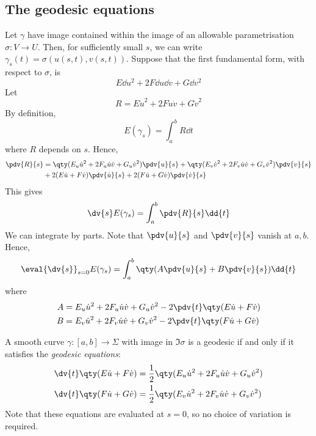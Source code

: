\subsection{The geodesic equations}
Let \( \gamma \) have image contained within the image of an allowable parametrisation \( \sigma \colon V \to U \).
Then, for sufficiently small \( s \), we can write \( \gamma_s(t) = \sigma(u(s,t), v(s,t)) \).
Suppose that the first fundamental form, with respect to \( \sigma \), is
\[
	E \dd{u}^2 + 2F \dd{u} \dd{v} + G \dd{v}^2
\]
Let
\[
	R = E \dot u^2 + 2F \dot u \dot v + G \dot v^2
\]
By definition,
\[
	E(\gamma_s) = \int_a^b R \dd{t}
\]
where \( R \) depends on \( s \).
Hence,
\begin{align*}
	\pdv{R}{s} & = \qty(E_u \dot u^2 + 2F_u \dot u \dot v + G_u \dot v^2) \pdv{u}{s} + \qty(E_v \dot v^2 + 2F_v \dot u \dot v + G_v \dot v^2) \pdv{v}{s} \\
	           & + 2 (E \dot u + F \dot v) \pdv{\dot u}{s} + 2(F \dot u + G \dot v) \pdv{\dot v}{s}
\end{align*}
This gives
\[
	\dv{s} E(\gamma_s) = \int_a^b \pdv{R}{s} \dd{t}
\]
We can integrate by parts.
Note that \( \pdv{u}{s} \) and \( \pdv{v}{s} \) vanish at \( a,b \).
Hence,
\[
	\eval{\dv{s}}_{s=0} E(\gamma_s) = \int_a^b \qty(A \pdv{u}{s} + B \pdv{v}{s}) \dd{t}
\]
where
\begin{align*}
	A & = E_u \dot u^2 + 2F_u \dot u \dot v + G_u \dot v^2 - 2 \pdv{t} \qty(E \dot u + F \dot v) \\
	B & = E_v \dot u^2 + 2F_v \dot u \dot v + G_v \dot v^2 - 2 \pdv{t} \qty(F \dot u + G \dot v)
\end{align*}
\begin{corollary}
	A smooth curve \( \gamma \colon [a,b] \to \Sigma \) with image in \( \Im \sigma \) is a geodesic if and only if it satisfies the \textit{geodesic equations}:
	\begin{align*}
		\dv{t} \qty(E \dot u + F \dot v) & = \frac{1}{2} \qty( E_u \dot u^2 + 2F_u \dot u \dot v + G_u \dot v^2 ) \\
		\dv{t} \qty(F \dot u + G \dot v) & = \frac{1}{2} \qty( E_v \dot u^2 + 2F_v \dot u \dot v + G_v \dot v^2 )
	\end{align*}
	Note that these equations are evaluated at \( s = 0 \), so no choice of variation is required.
\end{corollary}
